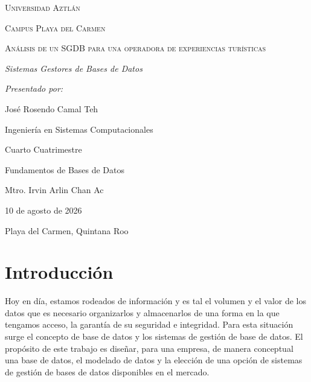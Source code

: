 \documentclass[12pt]{article}
\begin{document}
\begin{titlepage}
	\centering
	{\scshape\LARGE Universidad Aztlán \par}
	\vspace{1cm}
	{\scshape\Large Campus Playa del Carmen \par}
	\vspace{1.75cm}
	{\scshape\Huge Análisis de un SGDB para una operadora de experiencias turísticas \par}
    \vfill
    {\itshape\Large Sistemas Gestores de Bases de Datos \par}
	\vspace{2cm}
    {\itshape\Large Presentado por: \par}
	{\Large José Rosendo Camal Teh \par}
	\vfill
	{\Large Ingeniería en Sistemas Computacionales \par}
	{\Large Cuarto Cuatrimestre \par}
	{\Large Fundamentos de Bases de Datos \par}
	\vfill
	{\Large Mtro. Irvin Arlin Chan Ac \par}
	\vfill
	{\Large 10 de agosto de 2026 \par}
	\vfill
	{\Large Playa del Carmen, Quintana Roo \par}
\end{titlepage}
\newpage

\tableofcontents
\newpage


\section*{\centering Introducción}


Hoy en día, estamos rodeados de información y es tal el volumen y el valor de los datos que es necesario organizarlos y almacenarlos de una forma en la que tengamos acceso, la garantía de su seguridad e integridad. Para esta situación surge el concepto de base de datos y los sistemas de gestión de base de datos. El propósito de este trabajo es diseñar, para una empresa, de manera conceptual una base de datos, el modelado de datos y la elección de una opción de sistemas de gestión de bases de datos disponibles en el mercado.
\newline
\end{document}
